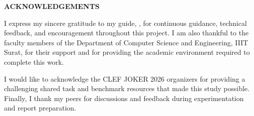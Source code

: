 \thispagestyle{plain}

\begin{center}
 \Large {\bf \uppercase{Acknowledgements}}
\end{center}

\vspace{2\baselineskip}
\justify
I express my sincere gratitude to my guide, \textbf{\mysupervisor}, for continuous guidance, technical feedback, and encouragement throughout this project. I am also thankful to the faculty members of the Department of Computer Science and Engineering, IIIT Surat, for their support and for providing the academic environment required to complete this work.

I would like to acknowledge the CLEF JOKER 2026 organizers for providing a challenging shared task and benchmark resources that made this study possible. Finally, I thank my peers for discussions and feedback during experimentation and report preparation.
